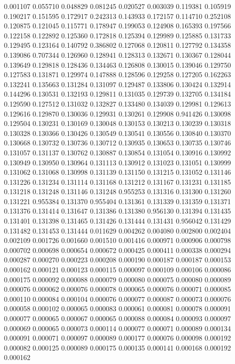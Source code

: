 0.001107
0.055710
0.048829
0.081245
0.020527
0.003039
0.119381
0.105919
0.190217
0.151595
0.172917
0.242313
0.143933
0.172157
0.114710
0.252108
0.120875
0.121045
0.115771
0.178947
0.199053
0.124908
0.165393
0.197566
0.122158
0.122892
0.125360
0.172818
0.125394
0.129989
0.125885
0.131733
0.129495
0.123164
0.140792
0.386802
0.127068
0.120811
0.127792
0.134358
0.139086
0.707344
0.126960
0.128941
0.128313
0.132671
0.130367
0.128044
0.139649
0.129818
0.128436
0.134463
0.126808
0.130015
0.139046
0.129750
0.127583
0.131871
0.129974
0.147888
0.128596
0.129258
0.127205
0.162263
0.132241
0.135663
0.131284
0.131097
0.129487
0.133806
0.130424
0.132914
0.144296
0.130531
0.132193
0.129811
0.131035
0.129739
0.132705
0.134184
0.129590
0.127512
0.131032
0.132827
0.133480
0.134039
0.129981
0.129613
0.129616
0.129870
0.130036
0.129931
0.130261
0.129908
0.941426
0.130098
0.129504
0.130231
0.130169
0.130048
0.130153
0.130213
0.130239
0.130318
0.130328
0.130366
0.130426
0.130549
0.130541
0.130556
0.130840
0.130370
0.130668
0.130732
0.130736
0.130712
0.130935
0.130653
0.130735
0.130746
0.131057
0.131137
0.130762
0.130887
0.130854
0.131054
0.130916
0.130992
0.130949
0.130950
0.130964
0.131113
0.130912
0.131023
0.131051
0.130999
0.131062
0.131068
0.130998
0.131139
0.131150
0.131215
0.131052
0.131146
0.131226
0.131234
0.131114
0.131168
0.131212
0.131167
0.131231
0.131185
0.131218
0.131248
0.131146
0.131248
0.955253
0.131316
0.131300
0.131260
0.131221
0.955384
0.131370
0.955404
0.131361
0.131339
0.131359
0.131371
0.131376
0.131414
0.131647
0.131386
0.131380
0.956130
0.131394
0.131435
0.131401
0.131398
0.131465
0.131426
0.131444
0.131431
0.956042
0.131429
0.131482
0.131453
0.131444
0.011629
0.004262
0.004080
0.002800
0.002404
0.002109
0.001726
0.001660
0.001510
0.001416
0.000971
0.000906
0.000798
0.000702
0.000698
0.000654
0.000672
0.000425
0.000411
0.000338
0.000294
0.000287
0.000270
0.000223
0.000208
0.000190
0.000187
0.000187
0.000153
0.000162
0.000121
0.000123
0.000115
0.000097
0.000109
0.000106
0.000086
0.000175
0.000092
0.000088
0.000079
0.000080
0.000075
0.000080
0.000089
0.000076
0.000062
0.000076
0.000078
0.000065
0.000076
0.000071
0.000085
0.000110
0.000084
0.000104
0.000076
0.000077
0.000087
0.000073
0.000076
0.000058
0.000102
0.000065
0.000083
0.000061
0.000081
0.000078
0.000091
0.000077
0.000065
0.000067
0.000065
0.000088
0.000084
0.000093
0.000097
0.000069
0.000065
0.000073
0.000114
0.000077
0.000071
0.000089
0.000134
0.000091
0.000071
0.000097
0.000089
0.000177
0.000076
0.000098
0.000192
0.000082
0.000125
0.000089
0.000175
0.000135
0.000141
0.000168
0.000192
0.000162
